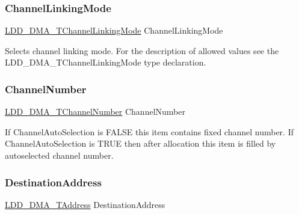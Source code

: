 \subsubsection{\texorpdfstring{Channel\+Linking\+Mode}{ChannelLinkingMode}}
{\footnotesize\ttfamily \hyperlink{group___p_e___types__module_ga7a25c76afefd56aca723c89d7098c89b}{L\+D\+D\+\_\+\+D\+M\+A\+\_\+\+T\+Channel\+Linking\+Mode} Channel\+Linking\+Mode}

Selects channel linking mode. For the description of allowed values see the L\+D\+D\+\_\+\+D\+M\+A\+\_\+\+T\+Channel\+Linking\+Mode type declaration. \mbox{\label{struct_l_d_d___d_m_a___t_transfer_descriptor_a203b693a350df7170042dd0c18ffd6bb}} 
\subsubsection{\texorpdfstring{Channel\+Number}{ChannelNumber}}
{\footnotesize\ttfamily \hyperlink{group___p_e___types__module_gad268d607015891269cb015faa8bc0dac}{L\+D\+D\+\_\+\+D\+M\+A\+\_\+\+T\+Channel\+Number} Channel\+Number}

If Channel\+Auto\+Selection is F\+A\+L\+SE this item contains fixed channel number. If Channel\+Auto\+Selection is T\+R\+UE then after allocation this item is filled by autoselected channel number. \mbox{\label{struct_l_d_d___d_m_a___t_transfer_descriptor_af0babeeccbb44dbec87aa44169d9ac57}} 
\subsubsection{\texorpdfstring{Destination\+Address}{DestinationAddress}}
{\footnotesize\ttfamily \hyperlink{group___p_e___types__module_gab8287f62db7ff96992355760b652cd07}{L\+D\+D\+\_\+\+D\+M\+A\+\_\+\+T\+Address} Destination\+Address}

